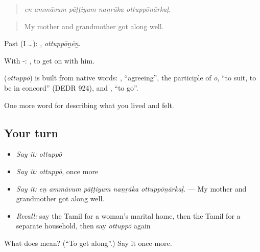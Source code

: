 \begin{quote}
\emph{eṉ ammāvum pāṭṭiyum naṉṟāka ottuppōṉārkaḷ.}
\end{quote}

\begin{quote}
My mother and grandmother got along well.
\end{quote}

Past (I …): , \emph{ottuppōṉēṉ}.

With -:  , to get on with him.

\begin{cousinweb}
\textbf{} (\emph{ottuppō}) is built from native words: , \textquotedblleft{}agreeing\textquotedblright{}, the participle of  \emph{o}, \textquotedblleft{}to suit, to be in concord\textquotedblright{} (DEDR 924), and , \textquotedblleft{}to go\textquotedblright{}.
\end{cousinweb}

\begin{grammarlens}[title={What you've built}]
One more word for describing what you lived and felt.
\end{grammarlens}

\subsection*{Your turn}
\begin{itemize}
\raggedright
  \item \emph{Say it:} \emph{ottuppō}
  \item \emph{Say it:} \emph{ottuppō}, once more
  \item \emph{Say it:} \emph{eṉ ammāvum pāṭṭiyum naṉṟāka ottuppōṉārkaḷ.} — My mother and grandmother got along well.
  \item \emph{Recall:} say the Tamil for a woman’s marital home, then the Tamil for a separate household, then say \emph{ottuppō} again
\end{itemize}

\begin{tcolorbox}[breakable,colback=teal!4,colframe=teal!35!black,title={Before you move on}]
What does  mean? (\textquotedblleft{}To get along\textquotedblright{}.) Say it once more.
\end{tcolorbox}

